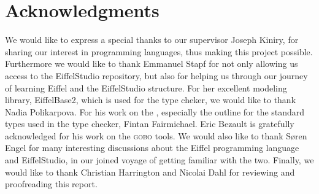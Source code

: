 \section{Acknowledgments}
We would like to express a special thanks to our supervisor Joseph Kiniry, for sharing our interest in programming languages, thus making this project possible. Furthermore we would like to thank Emmanuel Stapf for not only allowing us access to the EiffelStudio repository, but also for helping us through our journey of learning Eiffel and the EiffelStudio structure. For her excellent modeling library, EiffelBase2, which is used for the type cheker, we would like to thank Nadia Polikarpova. For his work on the , especially the outline for the standard \bon{} types used in the type checker, Fintan Fairmichael. Eric Bezault is gratefully acknowledged for his work on the \textsc{gobo} tools. We would also like to thank S\o ren Engel for many interesting discussions about the Eiffel programming language and EiffelStudio, in our joined voyage of getting familiar with the two. Finally, we would like to thank Christian Harrington and Nicolai Dahl for reviewing and proofreading this report.